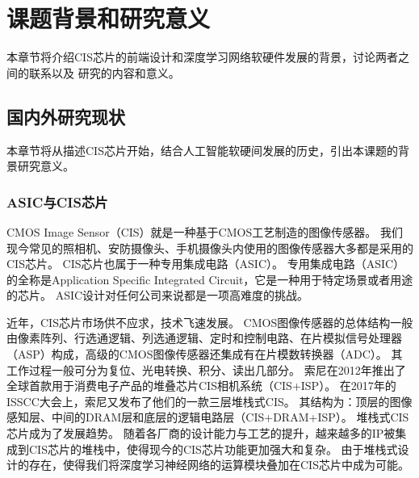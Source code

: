 
\chapter{课题背景和研究意义}

本章节将介绍CIS芯片的前端设计和深度学习网络软硬件发展的背景，讨论两者之间的联系以及
研究的内容和意义。

\section{国内外研究现状}
本章节将从描述CIS芯片开始，结合人工智能软硬间发展的历史，引出本课题的背景研究意义。


\subsection{ASIC与CIS芯片}
CMOS Image Sensor（CIS）就是一种基于CMOS工艺制造的图像传感器。
我们现今常见的照相机、安防摄像头、手机摄像头内使用的图像传感器大多都是采用的CIS芯片。
CIS芯片也属于一种专用集成电路（ASIC）。
专用集成电路（ASIC）的全称是Application Specific Integrated Circuit，它是一种用于特定场景或者用途的芯片。
ASIC设计对任何公司来说都是一项高难度的挑战。  

近年，CIS芯片市场供不应求，技术飞速发展。
CMOS图像传感器的总体结构一般由像素阵列、行选通逻辑、列选通逻辑、定时和控制电路、在片模拟信号处理器（ASP）构成，高级的CMOS图像传感器还集成有在片模数转换器（ADC）\cite{2009CMOS}。
其工作过程一般可分为复位、光电转换、积分、读出几部分。  
索尼在2012年推出了全球首款用于消费电子产品的堆叠芯片CIS相机系统（CIS+ISP）。
在2017年的ISSCC大会上，索尼又发布了他们的一款三层堆栈式CIS\parencite{sony2017}。 %
其结构为：顶层的图像感知层、中间的DRAM层和底层的逻辑电路层（CIS+DRAM+ISP）。
堆栈式CIS芯片成为了发展趋势。
随着各厂商的设计能力与工艺的提升，越来越多的IP被集成到CIS芯片的堆栈中，使得现今的CIS芯片功能更加强大和复杂。
由于堆栈式设计的存在，使得我们将深度学习神经网络的运算模块叠加在CIS芯片中成为可能。  

